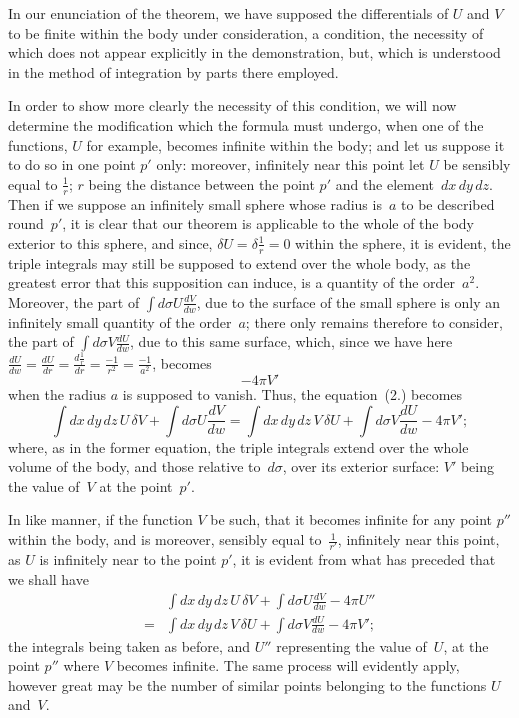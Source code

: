\documentclass[12pt,notitlepage]{amsart}
\begin{document}
In our enunciation of the theorem, we have supposed the differentials
of $U$ and $V$ to be finite within the body under consideration, a condition,
the necessity of which does not appear explicitly in the demonstration, but,
which is understood in the method of integration by parts there employed.

In order to show more clearly the necessity of this condition, we will
now determine the modification which the formula must undergo, when one
of the functions, $U$ for example, becomes infinite within the body; and let us
suppose it to do so in one point $p'$ only: moreover, infinitely near this point
let $U$ be sensibly equal to $\frac1r$;
$r$ being the distance between the point $p'$ and
the element~$dx\,dy\,dz$. Then if we suppose an
infinitely small sphere whose
radius is~$a$ to be described round~$p'$,
it is clear that our theorem is applicable
to the whole of the body exterior to this sphere, and since,
$\delta U=\delta\frac1r=0$
within the sphere, it is evident, the triple integrals may still be supposed to
extend over the whole body, as the greatest error that this supposition can
induce, is a quantity of the order~$a^2$.
Moreover, the part of $\int d\sigma U\frac{dV}{dw}$, due
to the surface of the small sphere is only an infinitely small quantity of the
order~$a$; there only remains therefore to consider,
the part of $\int d\sigma V\frac{dU}{dw}$, due
to this same surface, which, since we have here
$\frac{dU}{dw}=\frac{dU}{dr}=\frac{d\frac1r}{dr}=\frac{-1}{r^2}=\frac{-1}{a^2}$,
becomes
\[
-4\pi V'
\]
when the radius $a$ is supposed to vanish. Thus, the equation~(2.) becomes
\[
\tag{3.}
\int dx\,dy\,dz\,U\,\delta V+\int d\sigma U \frac{dV}{dw}=
\int dx\,dy\,dz\,V\,\delta U+\int d\sigma V \frac{dU}{dw}-4\pi V';
\]
where, as in the former equation, the triple integrals extend over the whole
volume of the body, and those relative to~$d\sigma$, over its exterior surface:
$V'$ being the value of~$V$ at the point~$p'$.

In like manner, if the function $V$ be such, that it becomes infinite for
any point $p''$ within the body, and is moreover,
sensibly equal to~$\frac{1}{r'}$, infinitely
near this point, as $U$ is infinitely near to the point $p'$, it is evident
from what has preceded that we shall have
\[
\tag{3.'}
\begin{aligned}
&\int dx\,dy\,dz\,U\,\delta V+\int d\sigma U \frac{dV}{dw}-4\pi U''\\
=&\int dx\,dy\,dz\,V\,\delta U+\int d\sigma V \frac{dU}{dw}-4\pi V';
\end{aligned}
\]
the integrals being taken as before,
and $U''$ representing the value of~$U$, at
the point $p''$ where $V$ becomes infinite. The same process will evidently
apply, however great may be the number of similar points belonging to the
functions $U$ and~$V$.
\end{document}
